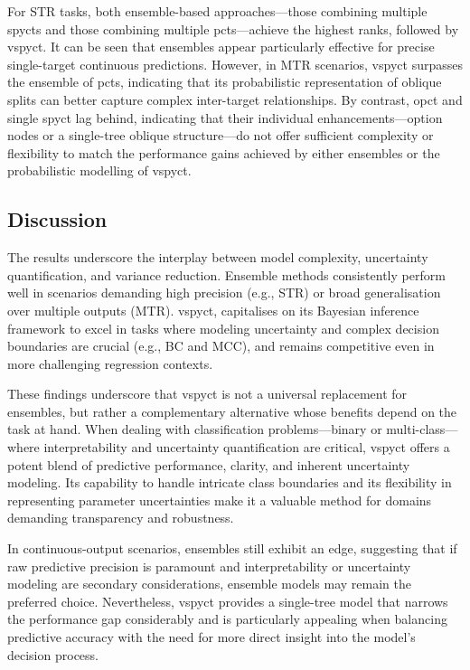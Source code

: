 \documentclass[3p,review,authoryear]{elsarticle}
\begin{document}
For STR tasks, both ensemble-based approaches—those combining multiple \glspl{spyct} and those combining multiple \glspl{pct}—achieve the highest ranks, followed by \gls{vspyct}.
It can be seen that ensembles appear particularly effective for precise single-target continuous predictions.
However, in MTR scenarios, \gls{vspyct} surpasses the ensemble of \glspl{pct}, indicating that its probabilistic representation of oblique splits can better capture complex inter-target relationships.
By contrast, \gls{opct} and single \gls{spyct} lag behind, indicating that their individual enhancements—option nodes or a single-tree oblique structure—do not offer sufficient complexity or flexibility to match the performance gains achieved by either ensembles or the probabilistic modelling of \gls{vspyct}.


\subsection{Discussion}

The results underscore the interplay between model complexity, uncertainty quantification, and variance reduction.
Ensemble methods consistently perform well in scenarios demanding high precision (e.g., STR) or broad generalisation over multiple outputs (MTR).
\Gls{vspyct}, capitalises on its Bayesian inference framework to excel in tasks where modeling uncertainty and complex decision boundaries are crucial (e.g., BC and MCC), and remains competitive even in more challenging regression contexts.

These findings underscore that \gls{vspyct} is not a universal replacement for ensembles, but rather a complementary alternative whose benefits depend on the task at hand.
When dealing with classification problems—binary or multi-class—where interpretability and uncertainty quantification are critical, \gls{vspyct} offers a potent blend of predictive performance, clarity, and inherent uncertainty modeling.
Its capability to handle intricate class boundaries and its flexibility in representing parameter uncertainties make it a valuable method for domains demanding transparency and robustness.

In continuous-output scenarios, ensembles still exhibit an edge, suggesting that if raw predictive precision is paramount and interpretability or uncertainty modeling are secondary considerations, ensemble models may remain the preferred choice.
Nevertheless, \gls{vspyct} provides a single-tree model that narrows the performance gap considerably and is particularly appealing when balancing predictive accuracy with the need for more direct insight into the model’s decision process.
\end{document}
